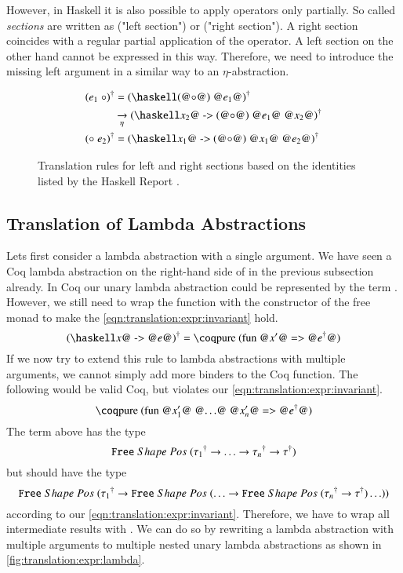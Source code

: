 However, in Haskell it is also possible to apply operators only partially.
So called \textit{sections} are written as  ("left section") or  ("right section").
A right section coincides with a regular partial application of the operator.
A left section on the other hand cannot be expressed in this way.
Therefore, we need to introduce the missing left argument in a similar way to an $\eta$-abstraction.
\begin{figure}[H]
  \begin{align*}
    \toCoq{(e_1\;\circ)}
      &= \toCoq{(\haskellM{(@$\circ$@) @$e_1$@})}                                        \\
      &\xrightarrow[\eta]{} \toCoq{(\haskellM{\@$x_2$@ -> (@$\circ$@) @$e_1$@ @$x_2$@})} \\
    \toCoq{(\circ\;e_2)}
      &= \toCoq{(\haskellM{\@$x_1$@ -> (@$\circ$@) @$x_1$@ @$e_2$@})}
  \end{align*}
  \caption{
    Translation rules for left and right sections based on the identities listed by the Haskell Report \cite[p.~19]{Marlow:2010}.
  }
  \label{fig:translation:expr:op}
\end{figure}

\subsection{Translation of Lambda Abstractions} \label{sec:translation:expr:lambda}
Lets first consider a lambda abstraction  with a single argument.
We have seen a Coq lambda abstraction on the right-hand side of \coq{>>=} in the previous subsection already.
In Coq our unary lambda abstraction could be represented by the term .
However, we still need to wrap the function with the  constructor of the free monad to make the \ref{eqn:translation:expr:invariant} hold.
\[
  \toCoq{(\haskellM{\@$x$@ -> @$e$@})} = \coqM{pure (fun @$x'$@ => @$\toCoqX{e}$@)}
\]
If we now try to extend this rule to lambda abstractions  with multiple arguments, we cannot simply add more binders to the Coq function.
The following would be valid Coq, but violates our \ref{eqn:translation:expr:invariant}.
\[
  \coqM{pure (fun @$x_1'$@ @$\ldots$@ @$x_n'$@ => @$\toCoqX{e}$@)}
\]
The term above has the type
\[
  {\texttt{Free}}\;Shape\;Pos\;{({\tau_1}^{\dagger}
    \rightarrow \ldots
    \rightarrow {\tau_n}^{\dagger}
    \rightarrow {\tau}^{\dagger})}
\]
but should have the type
\[
  {\texttt{Free}}\;Shape\;Pos\;{({\tau_1}^{\dagger}
    \rightarrow {\texttt{Free}}\;Shape\;Pos\;{(\ldots
    \rightarrow {\texttt{Free}}\;Shape\;Pos\;{({\tau_n}^{\dagger}
    \rightarrow {\tau}^{\dagger})} \ldots)})}
\]
according to our \ref{eqn:translation:expr:invariant}.
Therefore, we have to wrap all intermediate results with .
We can do so by rewriting a lambda abstraction with multiple arguments to multiple nested unary lambda abstractions as shown in \autoref{fig:translation:expr:lambda}.

